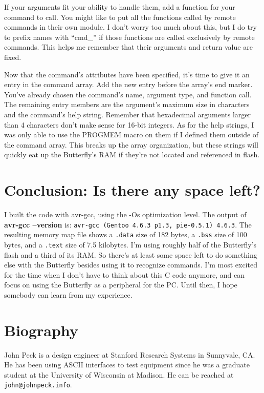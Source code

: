 If your arguments fit your ability to handle them, add a function for your command to call.  You might like to put all the functions called by remote commands in their own module.  I don't worry too much about this, but I do try to prefix names with ``cmd\_'' if those functions are called exclusively by remote commands.  This helps me remember that their arguments and return value are fixed.

Now that the command's attributes have been specified, it's time to give it an entry in the command array.  Add the new entry before the array's end marker.  You've already chosen the command's name, argument type, and function call.  The remaining entry members are the argument's maximum size in characters and the command's help string.  Remember that hexadecimal arguments larger than 4 characters don't make sense for 16-bit integers.  As for the help strings, I was only able to use the PROGMEM macro on them if I defined them outside of the command array.  This breaks up the array organization, but these strings will quickly eat up the Butterfly's RAM if they're not located and referenced in flash.  


\clearpage{}
\section{Conclusion: Is there any space left?}
I built the code with avr-gcc, using the -Os optimization level.  The output of \textbf{avr-gcc --version} is: \texttt{avr-gcc (Gentoo 4.6.3 p1.3, pie-0.5.1) 4.6.3}. The resulting memory map file shows a \texttt{.data} size of 182 bytes, a \texttt{.bss} size of 100 bytes, and a \texttt{.text} size of 7.5 kilobytes.  I'm using roughly half of the Butterfly's flash and a third of its RAM.  So there's at least some space left to do something else with the Butterfly besides using it to recognize commands.  I'm most excited for the time when I don't have to think about this C code anymore, and can focus on using the Butterfly as a peripheral for the PC.  Until then, I hope somebody can learn from my experience.

\section{Biography}
John Peck is a design engineer at Stanford Research Systems in Sunnyvale, CA.  He has been using ASCII interfaces to test equipment since he was a graduate student at the University of Wisconsin at Madison.  He can be reached at \texttt{john@johnpeck.info}.


\clearpage{}
\raggedright


